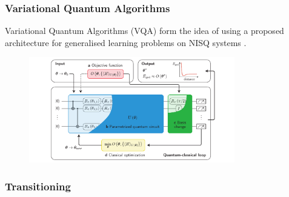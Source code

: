 


\begin{frame}
    \frametitle{Variational Quantum Algorithms}

    Variational Quantum Algorithms (VQA) form the idea of using a proposed
    architecture for generalised learning problems on NISQ systems
    \cite{bharti2021noisy}.

    \begin{figure}
        \includegraphics[width=0.8\textwidth]{figures/vqaarch.pdf}
    \end{figure}
\end{frame}

\begin{frame}
    \frametitle{Transitioning}


\end{frame}

